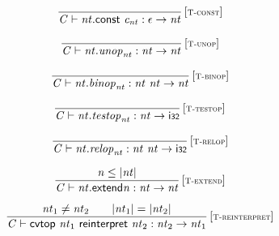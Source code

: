 $$
\begin{array}{@{}c@{}}\displaystyle
\frac{
}{
{\mathit{C}} \vdash {\mathit{nt}}.\mathsf{const}~{\mathit{c}}_{{\mathit{nt}}} : \epsilon \rightarrow {\mathit{nt}}
} \, {[\textsc{\scriptsize T{-}const}]}
\qquad
\end{array}
$$

$$
\begin{array}{@{}c@{}}\displaystyle
\frac{
}{
{\mathit{C}} \vdash {\mathit{nt}} . {\mathit{unop}}_{{\mathit{nt}}} : {\mathit{nt}} \rightarrow {\mathit{nt}}
} \, {[\textsc{\scriptsize T{-}unop}]}
\qquad
\end{array}
$$

$$
\begin{array}{@{}c@{}}\displaystyle
\frac{
}{
{\mathit{C}} \vdash {\mathit{nt}} . {\mathit{binop}}_{{\mathit{nt}}} : {\mathit{nt}}~{\mathit{nt}} \rightarrow {\mathit{nt}}
} \, {[\textsc{\scriptsize T{-}binop}]}
\qquad
\end{array}
$$

$$
\begin{array}{@{}c@{}}\displaystyle
\frac{
}{
{\mathit{C}} \vdash {\mathit{nt}} . {\mathit{testop}}_{{\mathit{nt}}} : {\mathit{nt}} \rightarrow \mathsf{i{\scriptstyle32}}
} \, {[\textsc{\scriptsize T{-}testop}]}
\qquad
\end{array}
$$

$$
\begin{array}{@{}c@{}}\displaystyle
\frac{
}{
{\mathit{C}} \vdash {\mathit{nt}} . {\mathit{relop}}_{{\mathit{nt}}} : {\mathit{nt}}~{\mathit{nt}} \rightarrow \mathsf{i{\scriptstyle32}}
} \, {[\textsc{\scriptsize T{-}relop}]}
\qquad
\end{array}
$$

\vspace{1ex}

$$
\begin{array}{@{}c@{}}\displaystyle
\frac{
{\mathit{n}} \leq {|{\mathit{nt}}|}
}{
{\mathit{C}} \vdash {{\mathit{nt}}.\mathsf{extend}}{{\mathit{n}}} : {\mathit{nt}} \rightarrow {\mathit{nt}}
} \, {[\textsc{\scriptsize T{-}extend}]}
\qquad
\end{array}
$$

$$
\begin{array}{@{}c@{}}\displaystyle
\frac{
{\mathit{nt}}_{{1}} \neq {\mathit{nt}}_{{2}}
 \qquad
{|{\mathit{nt}}_{{1}}|} = {|{\mathit{nt}}_{{2}}|}
}{
{\mathit{C}} \vdash \mathsf{cvtop}~{\mathit{nt}}_{{1}}~\mathsf{reinterpret}~{\mathit{nt}}_{{2}} : {\mathit{nt}}_{{2}} \rightarrow {\mathit{nt}}_{{1}}
} \, {[\textsc{\scriptsize T{-}reinterpret}]}
\qquad
\end{array}
$$

